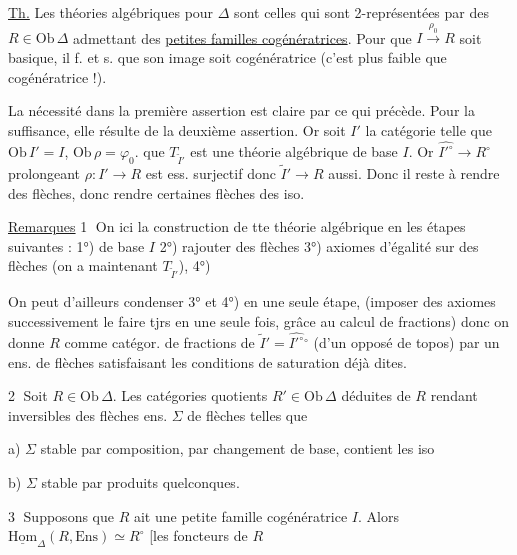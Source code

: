 \uline{Th.} Les théories algébriques pour $\Delta$ sont celles qui sont 2-représentées par des $R\in\mathrm{Ob}\,\Delta$ admettant des \uline{petites familles  cogénératrices}. Pour que $I\xrightarrow{\rho_0}R$  soit \inserted{$\Delta$-}basique, il f. et s. que son image soit cogénératrice (c'est plus faible que  cogénératrice !).

La nécessité dans la première assertion est claire par ce qui précède. Pour la suffisance,  elle résulte de la deuxième assertion. Or soit $I'$ la catégorie  telle que $\mathrm{Ob}\,I'=I$, $\mathrm{Ob}\,\rho=\varphi_0$.    que $T_{\widetilde I'}$ est une théorie algébrique de base $I$. Or $\widehat{I'^\circ}\longrightarrow R^\circ$ prolongeant $\rho:I'\longrightarrow R$ est ess. surjectif  donc $\widetilde I'\longrightarrow R$ aussi. Donc il  reste à rendre  des  flèches, donc rendre certaines flèches des iso.

\uline{Remarques} \textcircled{1} On   ici  la construction de tte théorie algébrique en les étapes suivantes : 1°)  de base $I$ 2°) rajouter des flèches 3°) axiomes d'égalité sur des  flèches (on a maintenant $T_{\widetilde I'}$), 4°)  

On peut d'ailleurs condenser 3° et 4°) en une seule étape,  (imposer des axiomes successivement  le faire tjrs en une seule fois, grâce au calcul de fractions) donc on donne $R$  comme catégor. de fractions de $\widetilde I'=\widehat{I'^\circ}{}^\circ$ (d'un opposé de topos) par un ens. de flèches satisfaisant les conditions de saturation déjà dites.

\textcircled{2} Soit $R\in\mathrm{Ob}\,\Delta$. Les catégories quotients $R'\in\mathrm{Ob}\,\Delta$ déduites de $R$  rendant inversibles des flèches   ens. $\Sigma$ de flèches \deleted{$\Sigma$} telles que

a) $\Sigma$ stable par composition, par changement de base, contient les iso

b) $\Sigma$ stable par produits quelconques.

\textcircled{3} Supposons que $R$ ait une petite famille cogénératrice $I$. Alors  $\underline{\mathrm{Hom}}_{\Delta}(R,\mathrm{Ens})\simeq R^\circ$ [les foncteurs de $R$
